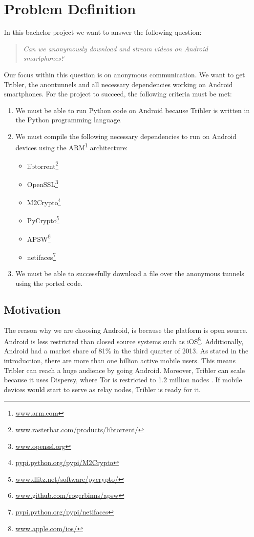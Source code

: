 \chapter{Problem Definition}
\label{cpt:problemdefinition}

In this bachelor project we want to answer the following question:

\begin{quote}
\emph{Can we anonymously download and stream videos on Android smartphones?}
\end{quote}

Our focus within this question is on anonymous communication. We want to get Tribler, the anontunnels and all necessary dependencies working on Android smartphones. For the project to succeed, the following criteria must be met:
\begin{enumerate}
\item We must be able to run Python code on Android because Tribler is written in the Python programming language.
\item We must compile the following necessary dependencies to run on Android devices using the ARM\footnote{\href{http://www.arm.com/}{www.arm.com}} architecture:
\begin{itemize}
\item libtorrent\footnote{\href{http://www.rasterbar.com/products/libtorrent/}{www.rasterbar.com/products/libtorrent/}}
\item OpenSSL\footnote{\href{http://www.openssl.org/}{www.openssl.org}}
\item M2Crypto\footnote{\href{https://pypi.python.org/pypi/M2Crypto}{pypi.python.org/pypi/M2Crypto}}
\item PyCrypto\footnote{\href{https://www.dlitz.net/software/pycrypto/}{www.dlitz.net/software/pycrypto/}}
\item APSW\footnote{\href{https://github.com/rogerbinns/apsw}{www.github.com/rogerbinns/apsw}}
\item netifaces\footnote{\href{https://pypi.python.org/pypi/netifaces}{pypi.python.org/pypi/netifaces}}
\end{itemize}
\item We must be able to successfully download a file over the anonymous tunnels using the ported code.
\end{enumerate}

	\section{Motivation}
	\label{sec:motivation}
		The reason why we are choosing Android, is because the platform is open source. Android is less restricted than closed source systems such as iOS\footnote{\href{http://www.apple.com/ios/}{www.apple.com/ios/}}. Additionally, Android had a market share of 81\% in the third quarter of 2013\cite{forbesandroidmarket}. As stated in the introduction, there are more than one billion active mobile users. This means Tribler can reach a huge audience by going Android. Moreover, Tribler can scale because it uses Dispersy, where Tor is restricted to 1.2 million nodes \cite{mclachlan2009scalable}. If mobile devices would start to serve as relay nodes, Tribler is ready for it.
		
